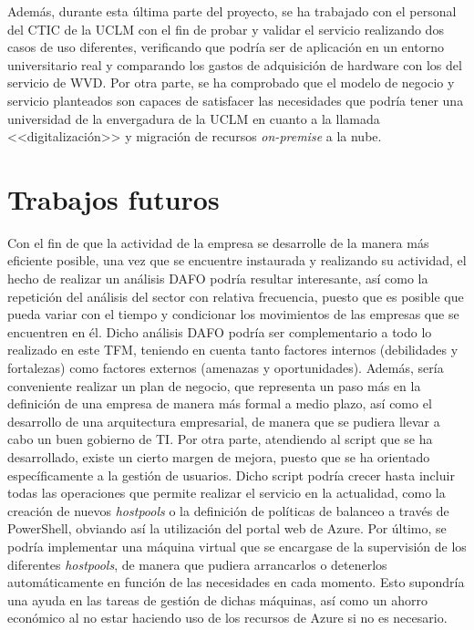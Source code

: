 \clearpage

Además, durante esta última parte del proyecto, se ha trabajado con el personal del \acf{CTIC} de la \acs{UCLM} con el fin de probar y validar el servicio realizando dos casos de uso diferentes, verificando que podría ser de aplicación en un entorno universitario real y comparando los gastos de adquisición de hardware con los del servicio de \acs{WVD}. Por otra parte, se ha comprobado que el modelo de negocio y servicio planteados son capaces de satisfacer las necesidades que podría tener una universidad de la envergadura de la \acs{UCLM} en cuanto a la llamada <<digitalización>> y migración de recursos \textit{on-premise} a la nube.

\section{Trabajos futuros}
Con el fin de que la actividad de la empresa se desarrolle de la manera más eficiente posible, una vez que se encuentre instaurada y realizando su actividad, el hecho de realizar un análisis \acs{DAFO} podría resultar interesante, así como la repetición del análisis del sector con relativa frecuencia, puesto que es posible que pueda variar con el tiempo y condicionar los movimientos de las empresas que se encuentren en él. Dicho análisis \acs{DAFO} podría ser complementario a todo lo realizado en este \acs{TFM}, teniendo en cuenta tanto factores internos (debilidades y fortalezas) como factores externos (amenazas y oportunidades). Además, sería conveniente realizar un plan de negocio, que representa un paso más en la definición de una empresa de manera más formal a medio plazo, así como el desarrollo de una arquitectura empresarial, de manera que se pudiera llevar a cabo un buen gobierno de \acs{TI}. Por otra parte, atendiendo al script que se ha desarrollado, existe un cierto margen de mejora, puesto que se ha orientado específicamente a la gestión de usuarios. Dicho script podría crecer hasta incluir todas las operaciones que permite realizar el servicio en la actualidad, como la creación de nuevos \textit{hostpools} o la definición de políticas de balanceo a través de PowerShell, obviando así la utilización del portal web de Azure. Por último, se podría implementar una máquina virtual que se encargase de la supervisión de los diferentes \textit{hostpools}, de manera que pudiera arrancarlos o detenerlos automáticamente en función de las necesidades en cada momento. Esto supondría una ayuda en las tareas de gestión de dichas máquinas, así como un ahorro económico al no estar haciendo uso de los recursos de Azure si no es necesario.

\newpage